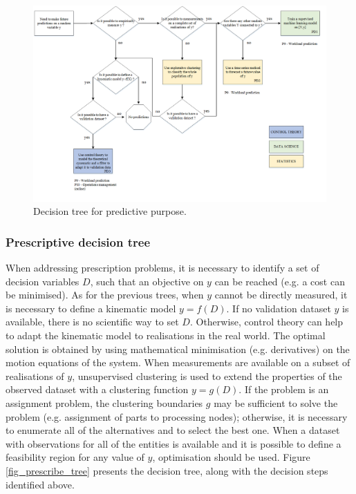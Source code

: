 \begin{landscape}
\thispagestyle{empty}
\begin{figure}[hbt!]
\centering
\includegraphics[width=1.5\textwidth]{SectionIntroduction/dataDrivenDecisions_fig/fig_predict_tree.png}
\captionsetup{type=figure}
\caption{Decision tree for predictive purpose.}
\label{fig_predict_tree}
\vfill
\end{figure}
\end{landscape}

\subsubsection{Prescriptive decision tree} \label{secPrescriptiveDecisionTree}
When addressing prescription problems, it is necessary to identify a set of decision variables $D$, such that an objective on $y$ can be reached (e.g. a cost can be minimised). As for the previous trees, when $y$ cannot be directly measured, it is necessary to define a kinematic model $y=f(D)$. If no validation dataset $\hat{y}$ is available, there is no scientific way to set $D$. Otherwise, control theory can help to adapt the kinematic model to realisations in the real world. The optimal solution is obtained by using mathematical minimisation (e.g. derivatives) on the motion equations of the system. When measurements are available on a subset of realisations of $y$, unsupervised clustering is used to extend the properties of the observed dataset with a clustering function $y=g(D)$. If the problem is an assignment problem, the clustering boundaries $g$ may be sufficient to solve the problem (e.g. assignment of parts to processing nodes); otherwise, it is necessary to enumerate all of the alternatives and to select the best one. When a dataset with observations for all of the entities is available and it is possible to define a feasibility region for any value of $y$, optimisation should be used. Figure \ref{fig_prescribe_tree} presents the decision tree, along with the decision steps identified above.

